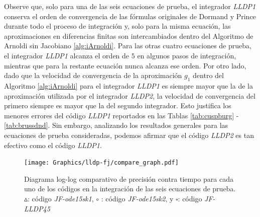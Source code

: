 Observe que, solo para una de las seis ecuaciones de prueba, el integrador \emph{LLDP1} conserva el orden de convergencia de las fórmulas originales de Dormand y Prince durante todo el proceso de integración y, solo para la misma ecuación, las aproximaciones en diferencias finitas son intercambiados dentro del Algoritmo de Arnoldi sin Jacobiano \ref{alg:iArnoldi}. Para las otras cuatro ecuaciones de prueba, el integrador \emph{LLDP1} alcanza el orden de $5$ en algunos pasos de integración, mientras que para la restante ecuación nunca alcanza ese orden. Por otro lado, dado que la velocidad de convergencia de la aproximación $g_1$ dentro del Algoritmo \ref{alg:iArnoldi} para el integrador \emph{LLDP1} es siempre mayor que la de la aproximación utilizada por el integrador \emph{LLDP2}, la velocidad de convergencia del primero siempre es mayor que la del segundo integrador. Esto justifica los menores errores del código \emph{LLDP1} reportados en las Tablas \ref{tab:cuspburg} - \ref{tab:brussdnd}. Sin embargo, analizando los resultados generales para las ecuaciones de prueba consideradas, podemos afirmar que el código \emph{LLDP2} es tan efectivo como el código \emph{LLDP1}.

\begin{figure}
	\begin{center}
		\hspace{-0.75in}
		\texttt{[image: Graphics/lldp-fj/compare\_graph.pdf]}
		\vspace{-0.95in}
		\caption{Diagrama log-log comparativo de precisión contra tiempo para cada uno de los códigos en la integración de las seis ecuaciones de prueba. $\vartriangle$: código \emph{JF-ode15sk1}, $\circ$ : código \emph{JF-ode15sk2}, y $\square$: código \emph{JF-LLDP45}}
		\label{lldpfj:Fig1}
	\end{center}
\end{figure}

